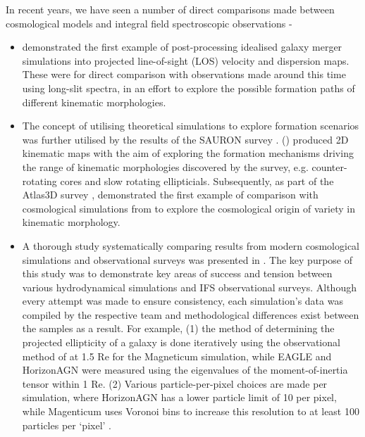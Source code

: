 \documentclass[
  journal=pasa,
  manuscript=research-paper, %
  year=2020,
  volume=37,
]{cup-journal}
\begin{document}
In recent years, we have seen a number of direct comparisons made between cosmological models and integral field spectroscopic observations -
\begin{itemize}
    \item \citealt{Bendo2000Theremnants} demonstrated the first example of post-processing idealised galaxy merger simulations into projected line-of-sight (LOS) velocity and dispersion maps. 
    These were for direct comparison with observations made around this time using long-slit spectra, in an effort to explore the possible formation paths of different kinematic morphologies. 
    \item The concept of utilising theoretical simulations to explore formation scenarios was further utilised by the results of the SAURON survey \citep{Bacon2001TheSpectrograph, deZeeuw2002TheResults, Emsellem2004TheGalaxies}. \citeauthor{Jesseit20072Dremnants} (\citeyear{Jesseit20072Dremnants, Jesseit2009Specificlambda_R-Parameter}) produced 2D kinematic maps with the aim of exploring the formation mechanisms driving the range of kinematic morphologies discovered by the survey, e.g. counter-rotating cores and slow rotating ellipticials. Subsequently, as part of the Atlas3D survey \citep{Cappellari2011Atlas3DIOverview}, \citealt{Naab2014TheRotators} demonstrated the first example of comparison with cosmological simulations from \citealt{Oser2010TheFormation} to explore the cosmological origin of variety in kinematic morphology.  
    \item A thorough study systematically comparing results from modern cosmological simulations and observational surveys was presented in  \citealt{vandeSande2019TheSimulations}. The key purpose of this study was to demonstrate key areas of success and tension between various hydrodynamical simulations and IFS observational surveys. Although every attempt was made to ensure consistency, each simulation's data was compiled by the respective team and methodological differences exist between the samples as a result. For example, (1) the method of determining the projected ellipticity of a galaxy is done iteratively using the observational method of \citealt{Cappellari2007TheKinematics} at 1.5 Re for the Magneticum simulation, while EAGLE and HorizonAGN were measured using the eigenvalues of the moment-of-inertia tensor within 1 Re. (2) Various particle-per-pixel choices are made per simulation, where HorizonAGN has a lower particle limit of 10 per pixel, while Magenticum uses Voronoi bins to increase this resolution to at least 100 particles per `pixel' \citep{Schulze2018KinematicsRedshifts}.
\end{itemize}
\end{document}
